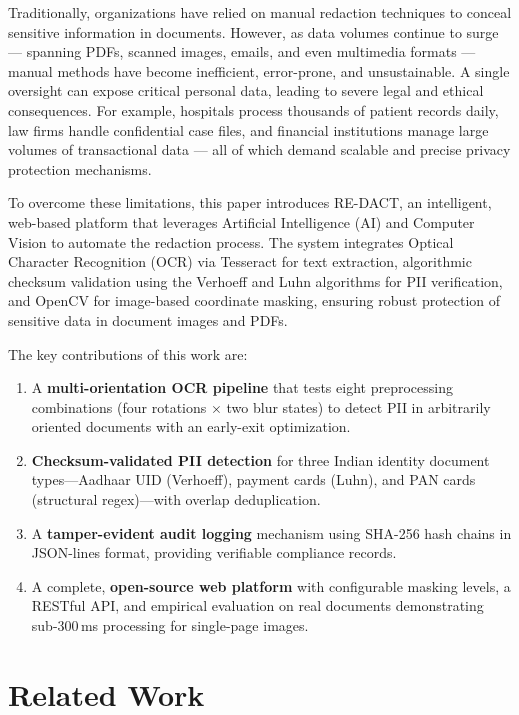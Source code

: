 \documentclass[conference]{IEEEtran}
\begin{document}
Traditionally, organizations have relied on manual redaction techniques to conceal sensitive information in documents. However, as data volumes continue to surge --- spanning PDFs, scanned images, emails, and even multimedia formats --- manual methods have become inefficient, error-prone, and unsustainable. A single oversight can expose critical personal data, leading to severe legal and ethical consequences. For example, hospitals process thousands of patient records daily, law firms handle confidential case files, and financial institutions manage large volumes of transactional data --- all of which demand scalable and precise privacy protection mechanisms.

To overcome these limitations, this paper introduces RE-DACT, an intelligent, web-based platform that leverages Artificial Intelligence (AI) and Computer Vision to automate the redaction process. The system integrates Optical Character Recognition (OCR) via Tesseract for text extraction, algorithmic checksum validation using the Verhoeff and Luhn algorithms for PII verification, and OpenCV for image-based coordinate masking, ensuring robust protection of sensitive data in document images and PDFs.

The key contributions of this work are:
\begin{enumerate}[leftmargin=*]
    \item A \textbf{multi-orientation OCR pipeline} that tests eight preprocessing combinations (four rotations $\times$ two blur states) to detect PII in arbitrarily oriented documents with an early-exit optimization.
    \item \textbf{Checksum-validated PII detection} for three Indian identity document types---Aadhaar UID (Verhoeff), payment cards (Luhn), and PAN cards (structural regex)---with overlap deduplication.
    \item A \textbf{tamper-evident audit logging} mechanism using SHA-256 hash chains in JSON-lines format, providing verifiable compliance records.
    \item A complete, \textbf{open-source web platform} with configurable masking levels, a RESTful API, and empirical evaluation on real documents demonstrating sub-300\,ms processing for single-page images.
\end{enumerate}


\section{Related Work}
\end{document}
